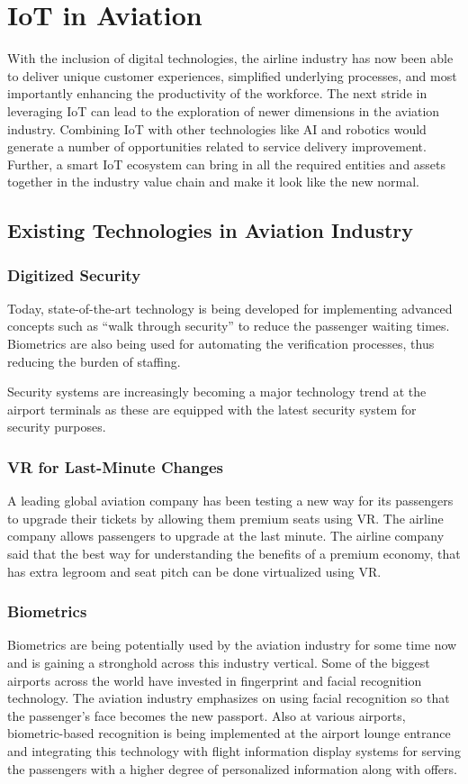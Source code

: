 \documentclass[a4paper,12pt]{book}
\begin{document}
\section{IoT in Aviation}
With the inclusion of digital technologies, the airline industry has now been able to deliver unique customer experiences, simplified underlying processes, and most importantly enhancing the productivity of the workforce. The next stride in leveraging IoT can lead to the exploration of newer dimensions in the aviation industry. Combining IoT with other technologies like AI and robotics would generate a number of opportunities related to service delivery improvement. Further, a smart  IoT ecosystem can bring in all the required entities and assets together in the industry value chain and make it look like the new normal.

\subsection{Existing Technologies in Aviation Industry}
\subsubsection{Digitized Security}
Today, state-of-the-art technology is being developed for implementing advanced concepts such as “walk through security” to reduce the passenger waiting times. Biometrics are also being used for automating the verification processes, thus reducing the burden of staffing.

Security systems are increasingly becoming a major technology trend at the airport terminals as these are equipped with the latest security system for security purposes.

\subsubsection{VR for Last-Minute Changes}
A leading global aviation company has been testing a new way for its passengers to upgrade their tickets by allowing them premium seats using VR. The airline company allows passengers to upgrade at the last  minute. The airline company said that the best way for understanding the benefits of a premium economy, that has extra legroom and seat pitch can be done virtualized using VR.

\subsubsection{Biometrics}
Biometrics are being potentially used by the aviation industry for some time now and is gaining a stronghold across this industry vertical. Some of the biggest airports across the world have invested in fingerprint and facial recognition technology. The aviation industry emphasizes on using facial recognition so that the passenger’s face becomes the new passport. Also at various airports, biometric-based recognition is being implemented at the airport lounge entrance and integrating this technology with flight information display systems for serving the passengers with a higher degree of personalized information along with offers.
\end{document}
